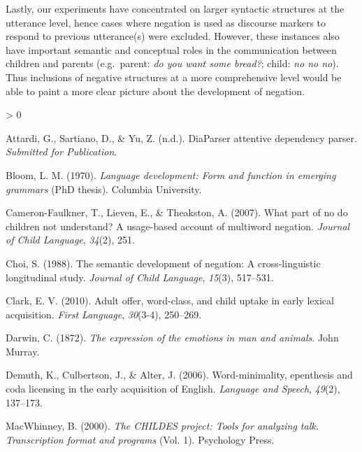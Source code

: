 \documentclass[
  english,
  man,floatsintext]{apa6}
\newlength{\cslhangindent}
\newenvironment{CSLReferences}[2] %
 {%
  \setlength{\parindent}{0pt}
  \ifodd #1 \everypar{\setlength{\hangindent}{\cslhangindent}}\ignorespaces\fi
  \ifnum #2 > 0
  \setlength{\parskip}{#2\baselineskip}
  \fi
 }%
 {}
\begin{document}
Lastly, our experiments have concentrated on larger syntactic structures at the utterance level, hence cases where negation is used as discourse markers to respond to previous utterance(s) were excluded. However, these instances also have important semantic and conceptual roles in the communication between children and parents (e.g.~parent: \emph{do you want some bread?}; child: \emph{no no no}). Thus inclusions of negative structures at a more comprehensive level would be able to paint a more clear picture about the development of negation.

\begingroup
\setlength{\parindent}{-0.5in}
\setlength{\leftskip}{0.5in}

\endgroup

\hypertarget{refs}{}
\begin{CSLReferences}{1}{0}
\leavevmode\hypertarget{ref-diaparser}{}%
Attardi, G., Sartiano, D., \& Yu, Z. (n.d.). DiaParser attentive dependency parser. \emph{Submitted for Publication}.

\leavevmode\hypertarget{ref-bloom1970language}{}%
Bloom, L. M. (1970). \emph{Language development: Form and function in emerging grammars} (PhD thesis). Columbia University.

\leavevmode\hypertarget{ref-cameron2007part}{}%
Cameron-Faulkner, T., Lieven, E., \& Theakston, A. (2007). What part of no do children not understand? A usage-based account of multiword negation. \emph{Journal of Child Language}, \emph{34}(2), 251.

\leavevmode\hypertarget{ref-choi1988semantic}{}%
Choi, S. (1988). The semantic development of negation: A cross-linguistic longitudinal study. \emph{Journal of Child Language}, \emph{15}(3), 517--531.

\leavevmode\hypertarget{ref-clark2010adult}{}%
Clark, E. V. (2010). Adult offer, word-class, and child uptake in early lexical acquisition. \emph{First Language}, \emph{30}(3-4), 250--269.

\leavevmode\hypertarget{ref-darwin1872expression}{}%
Darwin, C. (1872). \emph{The expression of the emotions in man and animals}. John Murray.

\leavevmode\hypertarget{ref-demuth2006word}{}%
Demuth, K., Culbertson, J., \& Alter, J. (2006). Word-minimality, epenthesis and coda licensing in the early acquisition of {E}nglish. \emph{Language and Speech}, \emph{49}(2), 137--173.

\leavevmode\hypertarget{ref-macwhinney2000childes}{}%
MacWhinney, B. (2000). \emph{The CHILDES project: Tools for analyzing talk. Transcription format and programs} (Vol. 1). Psychology Press.


\end{CSLReferences}
\end{document}
